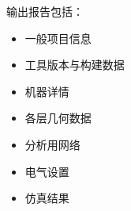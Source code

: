 输出报告包括：
\begin{itemize}
  \item 一般项目信息
  \item 工具版本与构建数据
  \item 机器详情
  \item 各层几何数据
  \item 分析用网络
  \item 电气设置
  \item 仿真结果
\end{itemize}
